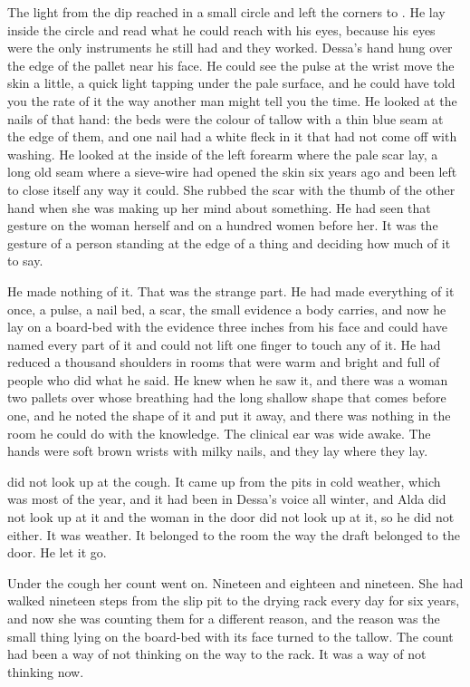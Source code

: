 The light from the dip reached in a small circle and left the corners to . He lay inside the circle and read what he could reach with his eyes, because his eyes were the only instruments he still had and they worked. Dessa's hand hung over the edge of the pallet near his face. He could see the pulse at the wrist move the skin a little, a quick light tapping under the pale surface, and he could have told you the rate of it the way another man might tell you the time. He looked at the nails of that hand: the beds were the colour of tallow with a thin blue seam at the edge of them, and one nail had a white fleck in it that had not come off with washing. He looked at the inside of the left forearm where the pale scar lay, a long old seam where a sieve-wire had opened the skin six years ago and been left to close itself any way it could. She rubbed the scar with the thumb of the other hand when she was making up her mind about something. He had seen that gesture on the woman herself and on a hundred women before her. It was the gesture of a person standing at the edge of a thing and deciding how much of it to say.

He made nothing of it. That was the strange part. He had made everything of it once, a pulse, a nail bed, a scar, the small evidence a body carries, and now he lay on a board-bed with the evidence three inches from his face and could have named every part of it and could not lift one finger to touch any of it. He had reduced a thousand shoulders in rooms that were warm and bright and full of people who did what he said. He knew  when he saw it, and there was a woman two pallets over whose breathing had the long shallow shape that comes before one, and he noted the shape of it and put it away, and there was nothing in the room he could do with the knowledge. The clinical ear was wide awake. The hands were soft brown wrists with milky nails, and they lay where they lay.

 did not look up at the cough. It came up from the pits in cold weather, which was most of the year, and it had been in Dessa's voice all winter, and Alda did not look up at it and the woman in the door did not look up at it, so he did not either. It was weather. It belonged to the room the way the draft belonged to the door. He let it go.

Under the cough her count went on. Nineteen and eighteen and nineteen. She had walked nineteen steps from the slip pit to the drying rack every day for six years, and now she was counting them for a different reason, and the reason was the small thing lying on the board-bed with its face turned to the tallow. The count had been a way of not thinking on the way to the rack. It was a way of not thinking now.

